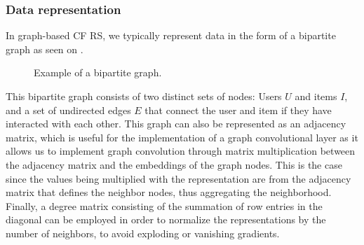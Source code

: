 \subsubsection*{Data representation}
In graph-based CF RS, we typically represent data in the form of a bipartite graph as seen on .
\begin{figure}[h]
\caption{Example of a bipartite graph.}
\label{fig:bipartite-graph}
\end{figure}
This bipartite graph consists of two distinct sets of nodes: Users $U$ and items $I$, and a set of undirected edges $E$ that connect the user and item if they have interacted with each other.
This graph can also be represented as an adjacency matrix, which is useful for the implementation of a graph convolutional layer as it allows us to implement graph convolution through matrix multiplication between the adjacency matrix and the embeddings of the graph nodes.
This is the case since the values being multiplied with the representation are from the adjacency matrix that defines the neighbor nodes, thus aggregating the neighborhood.\\
Finally, a degree matrix consisting of the summation of row entries in the diagonal can be employed in order to normalize the representations by the number of neighbors, to avoid exploding or vanishing gradients.

